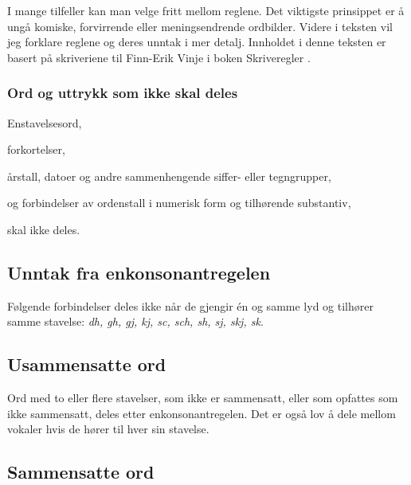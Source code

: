I mange tilfeller kan man velge fritt mellom reglene. Det viktigste prinsippet er å ungå komiske, forvirrende eller meningsendrende ordbilder. Videre i teksten vil jeg forklare reglene og deres unntak i mer detalj. Innholdet i denne teksten er basert på skriveriene til Finn-Erik Vinje i boken Skriveregler \cite{vinje}.

\subsubsection{Ord og uttrykk som ikke skal deles}

\begin{inparaenum}
\item Enstavelsesord, 
\item forkortelser,
\item  årstall, datoer og andre sammenhengende siffer- eller tegngrupper,
\item og forbindelser av ordenstall i numerisk form og tilhørende substantiv,
\end{inparaenum} skal ikke deles.

	\newline
	\newline
	\newline

\subsection{Unntak fra enkonsonantregelen}
\label{sec:enkons-untak}

Følgende forbindelser deles ikke når de gjengir én og samme lyd og tilhører samme stavelse:	\textit{dh, gh, gj, kj, sc, sch, sh, sj, skj, sk}.


\subsection{Usammensatte ord}

Ord med to eller flere stavelser, som ikke er sammensatt, eller som opfattes som ikke sammensatt, deles etter enkonsonantregelen. Det er også lov å dele mellom vokaler hvis de hører til hver sin stavelse.

	\newline

\subsection{Sammensatte ord}


